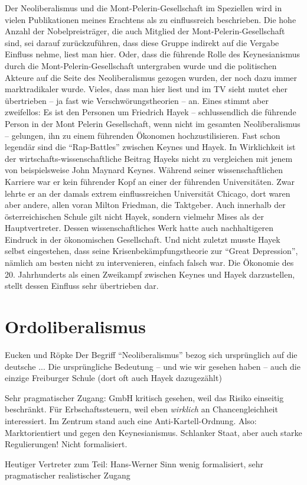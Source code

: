 Der Neoliberalismus und die Mont-Pelerin-Gesellschaft im Speziellen wird in vielen Publikationen meines Erachtens als zu einflussreich beschrieben. Die hohe Anzahl der Nobelpreisträger, die auch Mitglied der Mont-Pelerin-Gesellschaft sind, sei darauf zurückzuführen, dass diese Gruppe indirekt auf die Vergabe Einfluss nehme, liest man hier. Oder, dass die führende Rolle des Keynesianismus durch die Mont-Pelerin-Gesellschaft untergraben wurde und die politischen Akteure auf die Seite des Neoliberalismus gezogen wurden, der noch dazu immer marktradikaler wurde. Vieles, dass man hier liest und im TV sieht mutet eher übertrieben -- ja fast wie Verschwörungstheorien -- an. Eines stimmt aber zweifellos: Es ist den Personen um Friedrich Hayek -- schlussendlich die führende Person in der Mont Pelerin Gesellschaft, wenn nicht im gesamten Neoliberalismus -- gelungen, ihn zu einem führenden Ökonomen hochzustilisieren. Fast schon legendär sind die "`Rap-Battles"' zwischen Keynes und Hayek. In Wirklichkeit ist der wirtschafts-wissenschaftliche Beitrag Hayeks nicht zu vergleichen mit jenem von beispielsweise John Maynard Keynes. Während seiner wissenschaftlichen Karriere war er kein führender Kopf an einer der führenden Universitäten. Zwar lehrte er an der damals extrem einflussreichen Universität Chicago, dort waren aber andere, allen voran Milton Friedman, die Taktgeber. Auch innerhalb der österreichischen Schule gilt nicht Hayek, sondern vielmehr Mises als der Hauptvertreter. Dessen wissenschaftliches Werk hatte auch nachhaltigeren Eindruck in der ökonomischen Gesellschaft. Und nicht zuletzt musste Hayek selbst eingestehen, dass seine Krisenbekämpfungstheorie zur "`Great Depression"', nämlich am besten nicht zu intervenieren, einfach falsch war. Die Ökonomie des 20. Jahrhunderts als einen Zweikampf zwischen Keynes und Hayek darzustellen, stellt dessen Einfluss sehr übertrieben dar.







\section{Ordoliberalismus}
\label{Ordoliberalismus}

Eucken und Röpke
Der Begriff "`Neoliberalismus"' bezog sich ursprünglich auf die deutsche ...
Die ursprüngliche Bedeutung -- und wie wir gesehen haben -- auch die einzige 
Freiburger Schule (dort oft auch Hayek dazugezählt)


Sehr pragmatischer Zugang: GmbH kritisch gesehen, weil das Risiko einseitig beschränkt. Für Erbschaftssteuern, weil eben \textit{wirklich} an Chancengleichheit interessiert. Im Zentrum stand auch eine Anti-Kartell-Ordnung.
Also: Marktorientiert und gegen den Keynesianismus. Schlanker Staat, aber auch starke Regulierungen!
Nicht formalisiert. 

Heutiger Vertreter zum Teil: Hans-Werner Sinn wenig formalisiert, sehr pragmatischer realistischer Zugang

